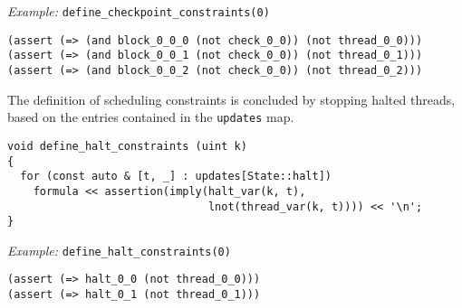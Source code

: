 \newpage
\noindent
\emph{Example:} \lstinline[style=c++]{define_checkpoint_constraints(0)}

\begin{lstlisting}[language=SMTLib]
(assert (=> (and block_0_0_0 (not check_0_0)) (not thread_0_0)))
(assert (=> (and block_0_0_1 (not check_0_0)) (not thread_0_1)))
(assert (=> (and block_0_0_2 (not check_0_0)) (not thread_0_2)))
\end{lstlisting}


%
%

\noindent
The definition of scheduling constraints is concluded by stopping halted threads, based on the entries contained in the \texttt{updates} map.

\begin{lstlisting}[style=c++]
void define_halt_constraints (uint k)
{
  for (const auto & [t, _] : updates[State::halt])
    formula << assertion(imply(halt_var(k, t),
                               lnot(thread_var(k, t)))) << '\n';
}
\end{lstlisting}


\noindent
\emph{Example:} \lstinline[style=c++]{define_halt_constraints(0)}

\begin{lstlisting}[language=SMTLib]
(assert (=> halt_0_0 (not thread_0_0)))
(assert (=> halt_0_1 (not thread_0_1)))
\end{lstlisting}



